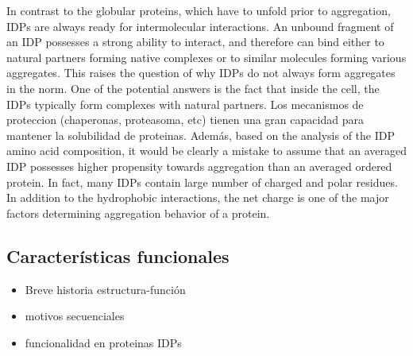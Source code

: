 In contrast to the globular proteins, which have to unfold prior to aggregation, IDPs are always ready for intermolecular interactions. 
An unbound fragment of an IDP possesses a strong ability to interact, and therefore can bind either to natural partners forming native complexes or to similar molecules forming various aggregates. 
This raises the question of why IDPs do not always form aggregates in the norm. One of the potential answers is the fact that inside the cell, the IDPs typically form complexes with natural partners.
Los mecanismos de proteccion (chaperonas, proteasoma, etc) tienen una gran capacidad para mantener la solubilidad de proteinas.
Además, based on the analysis of the IDP amino acid composition, it would be clearly a mistake to assume that an averaged IDP possesses higher propensity towards aggregation than an averaged ordered
protein. In fact, many IDPs contain large number of charged and polar residues. In addition to the hydrophobic interactions, the net charge is one of the major factors determining aggregation behavior of a protein.


































































\subsection{Características funcionales}
\label{functionalLandscape}
\begin{itemize}
 \item Breve historia estructura-función
 \item motivos secuenciales
 \item funcionalidad en proteinas IDPs
\end{itemize}


